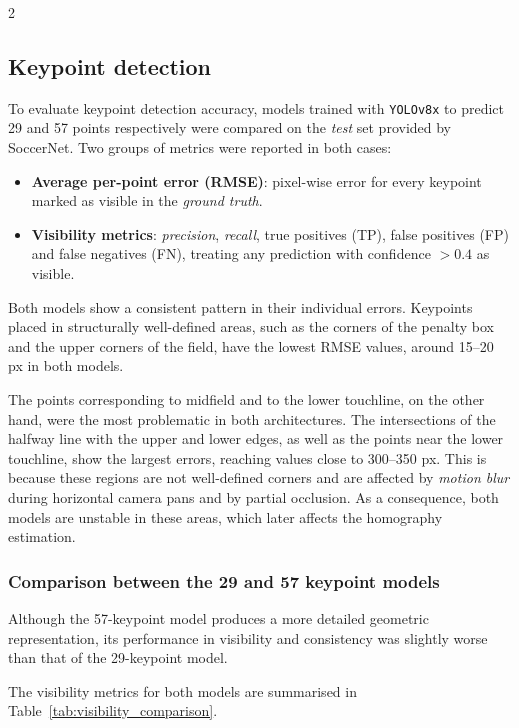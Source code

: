 \begin{multicols}{2}
\subsection{Keypoint detection}
To evaluate keypoint detection accuracy, models trained with \texttt{YOLOv8x} to predict 29 and 57 points respectively were compared on the \textit{test} set provided by SoccerNet. Two groups of metrics were reported in both cases:

\begin{itemize}
    \item \textbf{Average per-point error (RMSE)}: pixel-wise error for every keypoint marked as visible in the \textit{ground truth}.
    \item \textbf{Visibility metrics}: \textit{precision}, \textit{recall}, true positives (TP), false positives (FP) and false negatives (FN), treating any prediction with confidence $>0.4$ as visible.
\end{itemize}

Both models show a consistent pattern in their individual errors. Keypoints placed in structurally well-defined areas, such as the corners of the penalty box and the upper corners of the field, have the lowest RMSE values, around 15--20 px in both models.

The points corresponding to midfield and to the lower touchline, on the other hand, were the most problematic in both architectures. The intersections of the halfway line with the upper and lower edges, as well as the points near the lower touchline, show the largest errors, reaching values close to 300--350 px. This is because these regions are not well-defined corners and are affected by \textit{motion blur} during horizontal camera pans and by partial occlusion. As a consequence, both models are unstable in these areas, which later affects the homography estimation.

\subsubsection*{Comparison between the 29 and 57 keypoint models}

Although the 57-keypoint model produces a more detailed geometric representation, its performance in visibility and consistency was slightly worse than that of the 29-keypoint model.

The visibility metrics for both models are summarised in Table~\ref{tab:visibility_comparison}.


\end{multicols}
